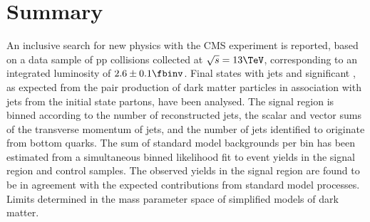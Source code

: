 \section{Summary}
\label{sec:summary}

An inclusive search for new physics with the CMS experiment is
reported, based on a data sample of pp collisions collected at
$\sqrt{s} = 13\TeV$, corresponding to an integrated luminosity of $2.6
\pm 0.1 \fbinv$. Final states with jets and significant \ETmiss, as
expected from the pair production of dark matter particles in association with jets from the initial state partons,
have been analysed. The signal region is binned according to the
number of reconstructed jets, the scalar and vector sums of the
transverse momentum of jets, and the number of jets identified to
originate from bottom quarks. The sum of standard model backgrounds
per bin has been estimated from a simultaneous binned likelihood fit
to event yields in the signal region and control samples. The observed
yields in the signal region are found to be in agreement with the
expected contributions from standard model processes. Limits %
 determined in the mass parameter space of
simplified models of dark matter.


